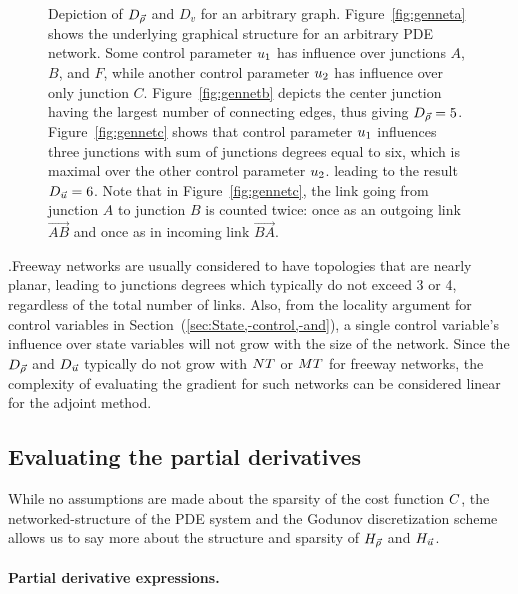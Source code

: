 \begin{figure}
\begin{centering}
{		}
		\par\end{centering}
		
		\caption{Depiction of $D_{\vec{\rho}}$ and $D_{v}$ for an arbitrary graph. Figure~\ref{fig:genneta}
			shows the underlying graphical structure for an arbitrary PDE network.
			Some control parameter $u_{1}$ has influence over junctions
			$A$, $B$, and $F$, while another control parameter $u_{2}$
			has influence over only junction $C$. Figure~\ref{fig:gennetb}
			depicts the center junction having the largest number of connecting
			edges, thus giving $D_{\vec{\rho}}=5$. Figure~\ref{fig:gennetc} shows
			that control parameter $u_{1}$ influences three junctions with
			sum of junctions degrees equal to six, which is maximal over the other
			control parameter $u_{2}$. leading to the result $D_{\vec{u}}=6$.
			Note that in Figure~\ref{fig:gennetc}, the link going from junction
			$A$ to junction $B$ is counted twice: once as an outgoing link $\vec{AB}$
			and once as in incoming link $\vec{BA}$.\label{fig:Depicting--and}}
		\end{figure}
		.Freeway networks are usually considered to have topologies that are
		nearly planar, leading to junctions degrees which typically do not
		exceed 3 or 4, regardless of the total number of links. Also, from
		the locality argument for control variables in Section~(\ref{sec:State,-control,-and}),
		a single control variable's influence over state variables will not
		grow with the size of the network. Since the $D_{\vec{\rho}}$ and
		$D_{\vec{u}}$ typically do not grow with $NT$ or
		$MT$ for freeway networks, the complexity of evaluating
		the gradient for such networks can be considered linear for the adjoint
		method.
		
		
		\subsection{Evaluating the partial derivatives\label{sub:Evaluating--and}}
		
		While no assumptions are made about the sparsity of the cost function
		$C$, the networked-structure of the PDE system and the Godunov
		discretization scheme allows us to say more about the structure and
		sparsity of $H_{\vec{\rho}}$ and $H_{\vec{u}}$.
		
		
		\paragraph{Partial derivative expressions.}
		
